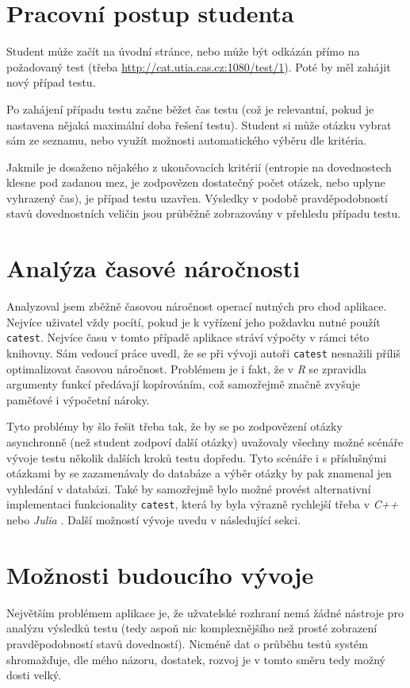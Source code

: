 \documentclass[a4paper,twoside,12pt]{scrbook}
\begin{document}
\section{Pracovní postup studenta}
Student může začít na úvodní stránce, nebo může být odkázán přímo na požadovaný test (třeba \url{http://cat.utia.cas.cz:1080/test/1}). Poté by měl zahájit nový případ testu.

Po zahájení případu testu začne běžet čas testu (což je relevantní, pokud je nastavena nějaká maximální doba řešení testu). Student si může otázku vybrat sám ze seznamu, nebo využít možnosti automatického výběru dle kritéria.

Jakmile je dosaženo nějakého z ukončovacích kritérií (entropie na dovednostech klesne pod zadanou mez, je zodpovězen dostatečný počet otázek, nebo uplyne vyhrazený čas), je případ testu uzavřen. Výsledky v podobě pravděpodobností stavů dovednostních veličin jsou průběžně zobrazovány v přehledu případu testu.

\section{Analýza časové náročnosti}
Analyzoval jsem zběžně časovou náročnost operací nutných pro chod aplikace. Nejvíce uživatel vždy pocítí, pokud je k vyřízení jeho poždavku nutné použít \texttt{catest}. Nejvíce času v tomto případě aplikace stráví výpočty v rámci této knihovny. Sám vedoucí práce uvedl, že se při vývoji autoři \texttt{catest} nesnažili příliš optimalizovat časovou náročnost. Problémem je i fakt, že v \textit{R} se zpravidla argumenty funkcí předávají kopírováním, což samozřejmě značně zvyšuje paměťové i výpočetní nároky.

Tyto problémy by šlo řešit třeba tak, že by se po zodpovězení otázky asynchronně (než student zodpoví další otázky) uvažovaly všechny možné scénáře vývoje testu několik dalších kroků testu dopředu. Tyto scénáře i s příslušnými otázkami by se zazamenávaly do databáze a výběr otázky by pak znamenal jen vyhledání v databázi. Také by samozřejmě bylo možné provést alternativní implementaci funkcionality \texttt{catest}, která by byla výrazně rychlejší třeba v \textit{C++} nebo \textit{Julia} \cite{julia}. Další možností vývoje uvedu v následující sekci.

\section{Možnosti budoucího vývoje}
Největším problémem aplikace je, že užvatelské rozhraní nemá žádné nástroje pro analýzu výsledků testu (tedy aspoň nic komplexnějšího než prosté zobrazení pravděpodobností stavů dovedností). Nicméně dat o průběhu testů systém shromažďuje, dle mého názoru, dostatek, rozvoj je v tomto směru tedy možný dosti velký.
\end{document}
